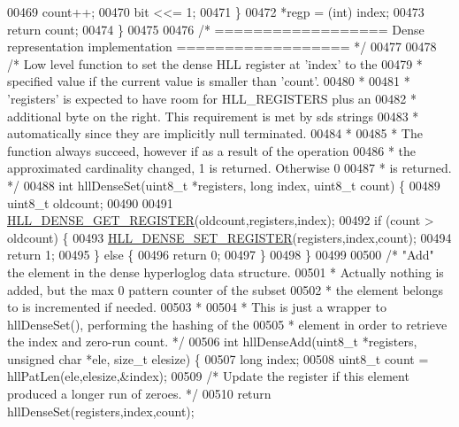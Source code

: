 \begin{DoxyCode}
{{00469         count++;
00470         bit <<= 1;
00471     \}
00472     *regp = (\textcolor{keywordtype}{int}) index;
00473     \textcolor{keywordflow}{return} count;
00474 \}
00475 
00476 \textcolor{comment}{/* ================== Dense representation implementation  ================== */}
00477 
00478 \textcolor{comment}{/* Low level function to set the dense HLL register at 'index' to the}
00479 \textcolor{comment}{ * specified value if the current value is smaller than 'count'.}
00480 \textcolor{comment}{ *}
00481 \textcolor{comment}{ * 'registers' is expected to have room for HLL\_REGISTERS plus an}
00482 \textcolor{comment}{ * additional byte on the right. This requirement is met by sds strings}
00483 \textcolor{comment}{ * automatically since they are implicitly null terminated.}
00484 \textcolor{comment}{ *}
00485 \textcolor{comment}{ * The function always succeed, however if as a result of the operation}
00486 \textcolor{comment}{ * the approximated cardinality changed, 1 is returned. Otherwise 0}
00487 \textcolor{comment}{ * is returned. */}
00488 \textcolor{keywordtype}{int} hllDenseSet(uint8\_t *registers, \textcolor{keywordtype}{long} index, uint8\_t count) \{
00489     uint8\_t oldcount;
00490 
00491     \hyperlink{hyperloglog_8c_abace3387aeb1543c9bcbd0d9a62c7ebc}{HLL\_DENSE\_GET\_REGISTER}(oldcount,registers,index);
00492     \textcolor{keywordflow}{if} (count > oldcount) \{
00493         \hyperlink{hyperloglog_8c_a57f99ca1675593d83a5b1fc014b3945a}{HLL\_DENSE\_SET\_REGISTER}(registers,index,count);
00494         \textcolor{keywordflow}{return} 1;
00495     \} \textcolor{keywordflow}{else} \{
00496         \textcolor{keywordflow}{return} 0;
00497     \}
00498 \}
00499 
00500 \textcolor{comment}{/* "Add" the element in the dense hyperloglog data structure.}
00501 \textcolor{comment}{ * Actually nothing is added, but the max 0 pattern counter of the subset}
00502 \textcolor{comment}{ * the element belongs to is incremented if needed.}
00503 \textcolor{comment}{ *}
00504 \textcolor{comment}{ * This is just a wrapper to hllDenseSet(), performing the hashing of the}
00505 \textcolor{comment}{ * element in order to retrieve the index and zero-run count. */}
00506 \textcolor{keywordtype}{int} hllDenseAdd(uint8\_t *registers, \textcolor{keywordtype}{unsigned} \textcolor{keywordtype}{char} *ele, size\_t elesize) \{
00507     \textcolor{keywordtype}{long} index;
00508     uint8\_t count = hllPatLen(ele,elesize,&index);
00509     \textcolor{comment}{/* Update the register if this element produced a longer run of zeroes. */}
00510     \textcolor{keywordflow}{return} hllDenseSet(registers,index,count);
}}
\end{DoxyCode}
